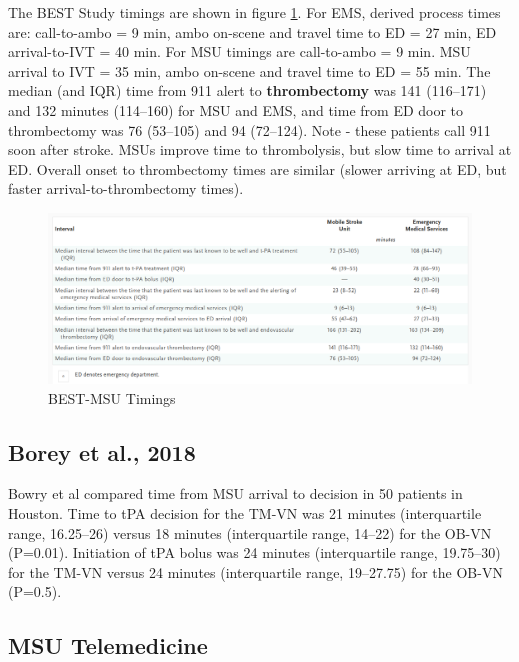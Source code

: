 The BEST Study \cite{grotta_prospective_2021} timings are shown in figure \ref{fig:best_msu_timings}. For EMS, derived process times are: call-to-ambo = 9 min, ambo on-scene and travel time to ED = 27 min, ED arrival-to-IVT = 40 min. For MSU timings are call-to-ambo = 9 min. MSU arrival to IVT = 35 min, ambo on-scene and travel time to ED = 55 min. The median (and IQR) time from 911 alert to \textbf{thrombectomy} was 141 (116–171) and 132 minutes (114–160) for MSU and EMS, and  time from ED door to thrombectomy was 76 (53–105) and 94 (72–124). Note - these patients call 911 soon after stroke. MSUs improve time to thrombolysis, but slow time to arrival at ED. Overall onset to thrombectomy times are similar (slower arriving at ED, but faster arrival-to-thrombectomy times). 

\begin{figure}
    \centering
    \includegraphics[width=0.75\linewidth]{images_background/best_msu_timings.png}
    \caption{BEST-MSU Timings}
    \label{fig:best_msu_timings}
\end{figure}


\subsection{Borey et al., 2018 \cite{bowry_time_2018}}

Bowry et al \cite{bowry_time_2018} compared time from MSU arrival to decision in 50 patients in Houston. Time to tPA decision for the TM-VN was 21 minutes (interquartile range, 16.25–26) versus 18 minutes (interquartile range, 14–22) for the OB-VN (P=0.01). Initiation of tPA bolus was 24 minutes (interquartile range, 19.75–30) for the TM-VN versus 24 minutes (interquartile range, 19–27.75) for the OB-VN (P=0.5).


\subsection{MSU Telemedicine}

